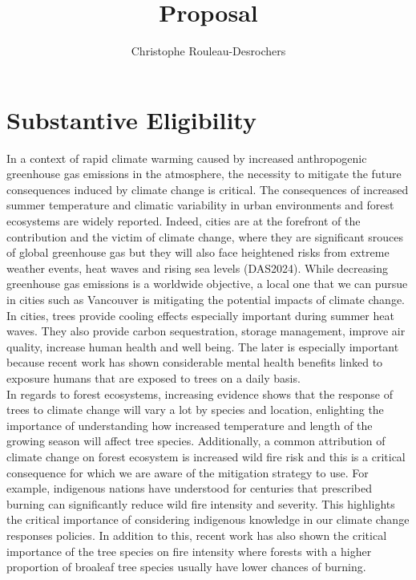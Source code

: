 \documentclass[11pt,letter]{article}
\title{Proposal}
\author{Christophe Rouleau-Desrochers}
\begin{document}

\maketitle


\section *{Substantive Eligibility} 
In a context of rapid climate warming caused by increased anthropogenic greenhouse gas emissions in the atmosphere, the necessity to mitigate the future consequences induced by climate change is critical. The consequences of increased summer temperature and climatic variability in urban environments and forest ecosystems are widely reported. Indeed, cities are at the forefront of the contribution and the victim of climate change, where they are significant srouces of global greenhouse gas but they will also face heightened risks from extreme weather events, heat waves and rising sea levels (DAS2024). While decreasing greenhouse gas emissions is a worldwide objective, a local one that we can pursue in cities such as Vancouver is mitigating the potential impacts of climate change. In cities, trees provide cooling effects especially important during summer heat waves. They also provide carbon sequestration, storage management, improve air quality, increase human health and well being. The later is especially important because recent work has shown considerable mental health benefits linked to exposure humans that are exposed to trees on a daily basis. \\
In regards to forest ecosystems, increasing evidence shows that the response of trees to climate change will vary a lot by species and location, enlighting the importance of understanding how increased temperature and length of the growing season will affect tree species. Additionally, a common attribution of climate change on forest ecosystem is increased wild fire risk and this is a critical consequence for which we are aware of the mitigation strategy to use. For example, indigenous nations have understood for centuries that prescribed burning can significantly reduce wild fire intensity and severity. This highlights the critical importance of considering indigenous knowledge in our climate change responses policies. In addition to this, recent work has also shown the critical importance of the tree species on fire intensity where forests with a higher proportion of broaleaf tree species usually have lower chances of burning. %
\end{document}
